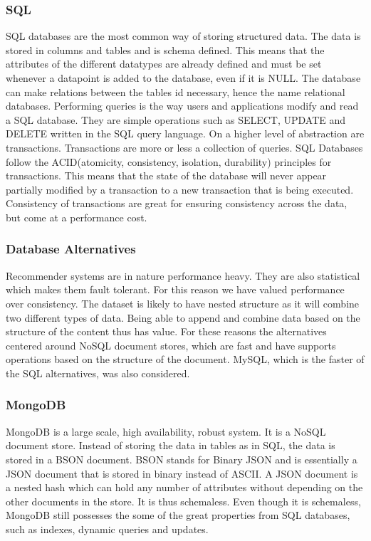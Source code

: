 \subsubsection*{SQL}
SQL databases are the most common way of storing structured data. The data is stored in columns and tables and is schema defined. This means that the attributes of the different datatypes are already defined and must be set whenever a datapoint is added to the database, even if it is NULL. The database can make relations between the tables id necessary, hence the name relational databases.
Performing queries is the way users and applications modify and read a SQL database. They are simple operations such as SELECT, UPDATE and DELETE written in the SQL query language. On a higher level of abstraction are transactions. Transactions are more or less a collection of queries. SQL Databases follow the ACID(atomicity, consistency, isolation, durability) principles for transactions. This means that the state of the database will never appear partially modified by a transaction to a new transaction that is being executed. Consistency of transactions are great for ensuring consistency across the data, but come at a performance cost.
\cite{ramakrishnan2003database}

\subsubsection{Database Alternatives}
Recommender systems are in nature performance heavy. They are also statistical which makes them fault tolerant. For this reason we have valued performance over consistency. The dataset is likely to have nested structure as it will combine two different types of data. Being able to append and combine data based on the structure of the content thus has value.
For these reasons the alternatives centered around NoSQL document stores, which are fast and have supports operations based on the structure of the document.
MySQL, which is the faster of the SQL alternatives, was also considered.

\subsubsection*{MongoDB}
MongoDB is a large scale, high availability, robust system. It is a NoSQL document store. Instead of storing the data in tables as in SQL, the data is stored in a BSON document. BSON stands for Binary JSON and is essentially a JSON document that is stored in binary instead of ASCII. A JSON document is a nested hash which can hold any number of attributes without depending on the other documents in the store. It is thus schemaless. Even though it is schemaless, MongoDB still possesses the some of the great properties from SQL databases, such as indexes, dynamic queries and updates.

